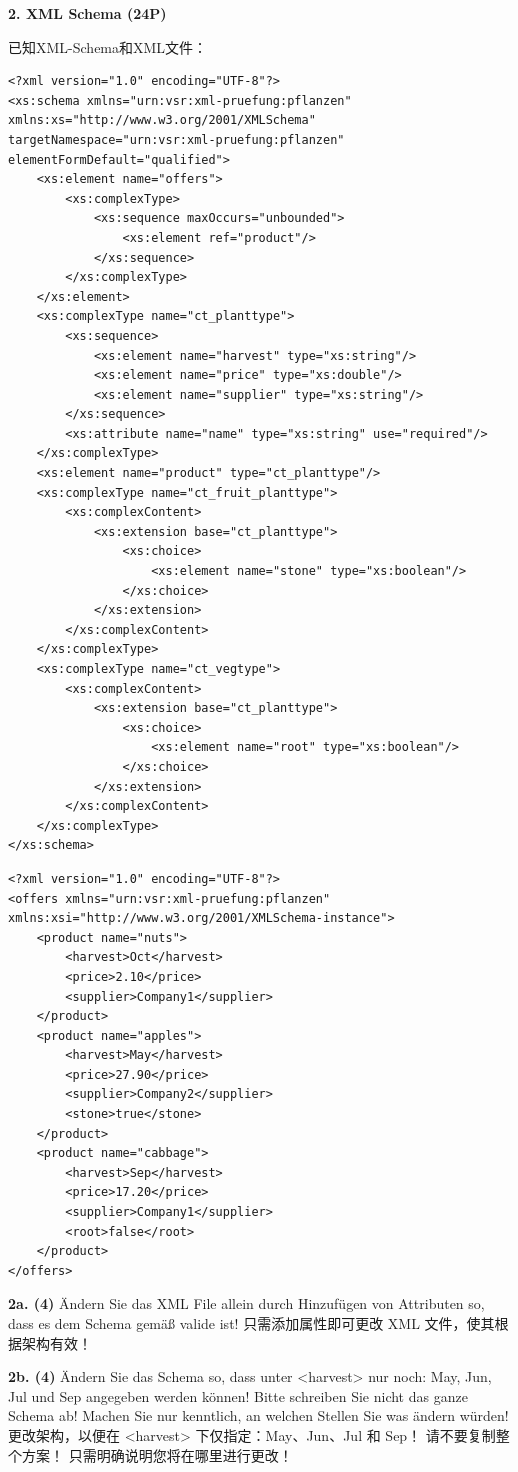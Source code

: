 \documentclass[fontset=windows]{article}
\begin{document}
\noindent\textbf{2. XML Schema (24P)}

已知XML-Schema和XML文件：

\begin{verbatim}
<?xml version="1.0" encoding="UTF-8"?> 
<xs:schema xmlns="urn:vsr:xml-pruefung:pflanzen" 
xmlns:xs="http://www.w3.org/2001/XMLSchema" 
targetNamespace="urn:vsr:xml-pruefung:pflanzen" 
elementFormDefault="qualified"> 
	<xs:element name="offers"> 
		<xs:complexType> 
			<xs:sequence maxOccurs="unbounded"> 
				<xs:element ref="product"/>
			</xs:sequence> 
		</xs:complexType>
	</xs:element> 
	<xs:complexType name="ct_planttype"> 
		<xs:sequence> 
			<xs:element name="harvest" type="xs:string"/> 
			<xs:element name="price" type="xs:double"/> 
			<xs:element name="supplier" type="xs:string"/>
		</xs:sequence> 
		<xs:attribute name="name" type="xs:string" use="required"/>
	</xs:complexType> 
	<xs:element name="product" type="ct_planttype"/> 
	<xs:complexType name="ct_fruit_planttype"> 
		<xs:complexContent> 
			<xs:extension base="ct_planttype"> 
				<xs:choice> 
					<xs:element name="stone" type="xs:boolean"/>
				</xs:choice> 
			</xs:extension> 
		</xs:complexContent>
	</xs:complexType> 
	<xs:complexType name="ct_vegtype"> 
		<xs:complexContent> 
			<xs:extension base="ct_planttype"> 
				<xs:choice> 
					<xs:element name="root" type="xs:boolean"/>
				</xs:choice> 
			</xs:extension> 
		</xs:complexContent> 
	</xs:complexType>
</xs:schema>
\end{verbatim}

\begin{verbatim}
<?xml version="1.0" encoding="UTF-8"?> 
<offers xmlns="urn:vsr:xml-pruefung:pflanzen" 
xmlns:xsi="http://www.w3.org/2001/XMLSchema-instance"> 
	<product name="nuts"> 
		<harvest>Oct</harvest> 
		<price>2.10</price> 
		<supplier>Company1</supplier>
	</product> 
	<product name="apples"> 
		<harvest>May</harvest> 
		<price>27.90</price> 
		<supplier>Company2</supplier> 
		<stone>true</stone>
	</product> 
	<product name="cabbage"> 
		<harvest>Sep</harvest> 
		<price>17.20</price> 
		<supplier>Company1</supplier> 
		<root>false</root>
	</product> 
</offers>
\end{verbatim}

\textbf{2a. (4) }Ändern Sie das XML File allein durch Hinzufügen von Attributen so, dass es dem Schema gemäß valide ist!
只需添加属性即可更改 XML 文件，使其根据架构有效！

\textbf{2b. (4) }Ändern Sie das Schema so, dass unter <harvest> nur noch: May, Jun, Jul und Sep angegeben werden können! Bitte schreiben Sie nicht das ganze Schema ab! Machen Sie nur kenntlich, an welchen Stellen Sie was ändern würden!
更改架构，以便在 <harvest> 下仅指定：May、Jun、Jul 和 Sep！ 请不要复制整个方案！ 只需明确说明您将在哪里进行更改！
\end{document}
